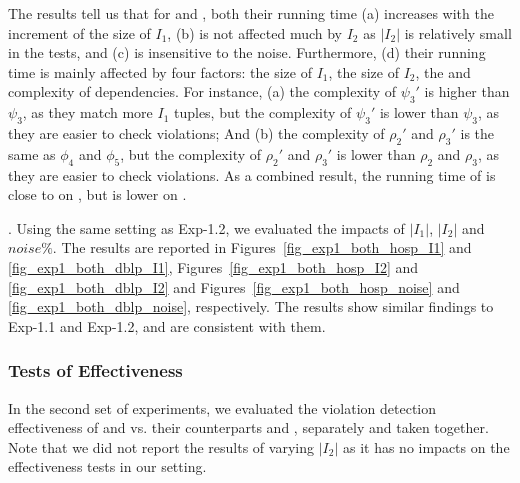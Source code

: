 The results tell us that for \CINDs and \pCINDs, both their running time (a) increases with the increment of the size of $I_1$, (b) is not affected much by $I_2$ as $|I_2|$ is relatively small in the tests, and (c) is insensitive to the noise. Furthermore, (d) their running time is mainly affected by four factors: the size of $I_1$, the size of $I_2$, the \LHS and \RHS complexity of dependencies.
For instance, (a) the \LHS complexity of \CIND $\psi_3'$ is higher than \pCFD $\psi_3$, as they match more $I_1$ tuples, but
the \RHS complexity of \CIND $\psi_3'$ is lower than \pCIND $\psi_3$, as they are easier to check violations; And
(b) the \LHS complexity of \CINDs $\rho_2'$ and $\rho_3'$ is the same as  \pCFDs $\phi_4$ and $\phi_5$, but
 the \RHS complexity of \CINDs $\rho_2'$ and $\rho_3'$ is lower than \pCINDs $\rho_2$ and $\rho_3$, as they are easier to check violations.
As a combined result, the running time of \CINDs is close to \pCFDs on \hosp, but is lower on \dblp.

.
Using the same setting as {Exp-1.2}, we evaluated the impacts of $|I_1|$, $|I_2|$ and $noise\%$. The results are reported in Figures~\ref{fig_exp1_both_hosp_I1} and \ref{fig_exp1_both_dblp_I1}, Figures~\ref{fig_exp1_both_hosp_I2} and \ref{fig_exp1_both_dblp_I2} and Figures~\ref{fig_exp1_both_hosp_noise} and \ref{fig_exp1_both_dblp_noise}, respectively. The results show similar findings to {Exp-1.1} and {Exp-1.2}, and are consistent with them.






\vspace{-1ex}
\subsubsection{Tests of Effectiveness}




In the second set of experiments, we evaluated the violation detection effectiveness of  \pCFDs and \pCINDs vs. their counterparts \CFDs and \CINDs, separately and taken together. Note that we did not report the results of varying $|I_{2}|$ as it has no impacts on the effectiveness tests in our setting.



